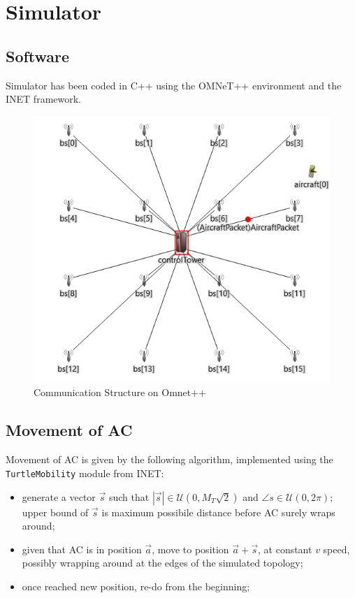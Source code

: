 \documentclass[a4paper,12pt]{article}
\begin{document}

\section{Simulator}
\subsection{Software}
Simulator has been coded in C++ using the OMNeT++ environment and the INET framework.
\begin{figure}[H]
  \centering
  \includegraphics[scale=0.7]{img/Implementation.png}
  \caption{Communication Structure on Omnet++}
  \label{fig:aircraft-ned}
\end{figure}

\subsection{Movement of AC}
Movement of AC is given by the following algorithm, implemented using the \texttt{TurtleMobility} module from INET:
\begin{itemize}
  \item generate a vector $\vec{s}$ such that $|\vec{s}| \in \mathcal{U}(0, M_{T}\sqrt{2})$ and $\angle{s} \in \mathcal{U}(0, 2\pi)$; upper bound of $\vec{s}$ is maximum possibile distance before AC surely wraps around;
  \item given that AC is in position $\vec{a}$, move to position $\vec{a} + \vec{s}$, at constant $v$ speed, possibly wrapping around at the edges of the simulated topology;
  \item once reached new position, re-do from the beginning;
\end{itemize}
\end{document}

